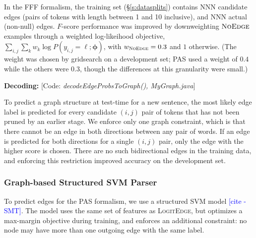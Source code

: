 \documentclass[11pt]{article}
\newcommand{\bocomment}[1]{\textcolor{Bittersweet}{[#1 -BTO]}}
\newcommand{\sam}[1]{\textcolor{blue}{[#1 -SMT]}}
\newcommand{\codenote}[1]{\textcolor{PineGreen}{[Code: \emph{#1}]}}
\newcommand{\logitedge}{\textsc{LogitEdge}}
\newcommand{\noedge}{\textsc{NoEdge}}
\begin{document}
In the FFF formalism, the training set (\S\ref{s:datasplits})
contains NNN candidate edges (pairs of tokens with length between 1 and 10 inclusive),
and NNN actual (non-null) edges.  $F$-score performance was improved by
downweighting $\noedge$ examples through a weighted log-likeihood objective,
$\sum_{i,j} \sum_k w_k \log P(y_{i,j}=\ell; \bm\phi)$, with $w_{\noedge}=0.3$
and $1$ otherwise.
(The weight was chosen by gridsearch on a development set; 
PAS used a weight of $0.4$ while the others were $0.3$, though the differences at this granularity were small.)



\textbf{Decoding:}
\codenote{decodeEdgeProbsToGraph(), MyGraph.java}

To predict a graph structure at test-time for a new sentence,
the most likely edge label is predicted for every candidate $(i, j)$ pair of
tokens that has not been pruned by an earlier stage.
We enforce only one graph constraint, which is that there cannot be
an edge in both directions between any pair of words.
If an edge is predicted for both directions for a single $(i, j)$
pair, only the edge with the higher score is chosen.
There are no such bidirectional edges in the training data, and enforcing this
restriction improved accuracy on the development set.%



\subsubsection{Graph-based Structured SVM Parser} \label{s:graphparser}

To predict edges for the PAS formalism, we use a structured SVM model
\sam{cite}.
The model uses the same set of features as \logitedge, but optimizes a
max-margin objective during training, and enforces an additional constraint: no
node may have more than one outgoing edge with the same label.
\end{document}
